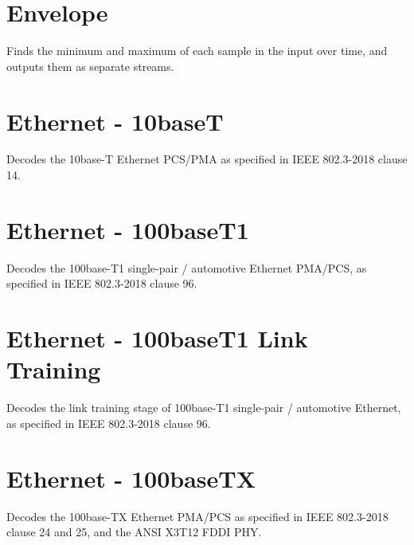 \pagebreak
\section{Envelope}
\label{filter:envelope}

Finds the minimum and maximum of each sample in the input over time, and outputs them as separate streams.

\pagebreak
\section{Ethernet - 10baseT}

Decodes the 10base-T Ethernet PCS/PMA as specified in IEEE 802.3-2018 clause 14.

\pagebreak
\section{Ethernet - 100baseT1}

Decodes the 100base-T1 single-pair / automotive Ethernet PMA/PCS, as specified in IEEE 802.3-2018 clause 96.

\pagebreak
\section{Ethernet - 100baseT1 Link Training}

Decodes the link training stage of 100base-T1 single-pair / automotive Ethernet, as specified in IEEE
802.3-2018 clause 96.

\pagebreak
\section{Ethernet - 100baseTX}

Decodes the 100base-TX Ethernet PMA/PCS as specified in IEEE 802.3-2018 clause 24 and 25, and the ANSI X3T12 FDDI PHY.

\pagebreak

